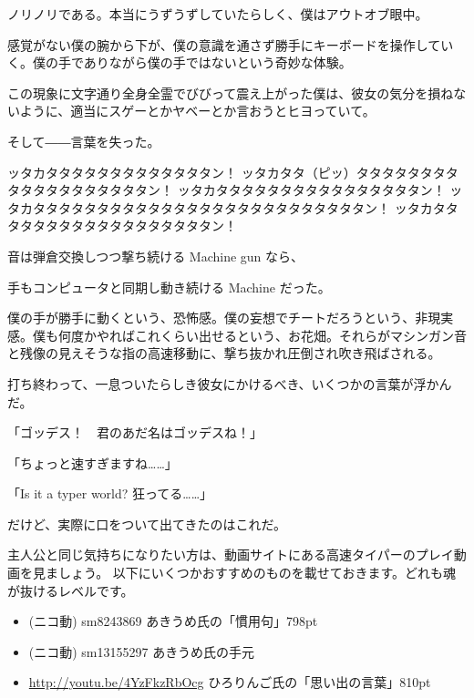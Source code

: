 
ノリノリである。本当にうずうずしていたらしく、僕はアウトオブ眼中。


感覚がない僕の腕から下が、僕の意識を通さず勝手にキーボードを操作していく。僕の手でありながら僕の手ではないという奇妙な体験。

この現象に文字通り全身全霊でびびって震え上がった僕は、彼女の気分を損ねないように、適当にスゲーとかヤベーとか言おうとヒヨっていて。

そして――言葉を失った。

ッタカタタタタタタタタタタタタタン！
ッタカタタ（ピッ）タタタタタタタタタタタタタタタタタタタン！
ッタカタタタタタタタタタタタタタタタタン！
ッタカタタタタタタタタタタタタタタタタタタタタタタタタタタン！
ッタカタタタタタタタタタタタタタタタタタタン！

音は弾倉交換しつつ撃ち続ける Machine gun なら、

手もコンピュータと同期し動き続ける Machine だった。

僕の手が勝手に動くという、恐怖感。僕の妄想でチートだろうという、非現実感。僕も何度かやればこれくらい出せるという、お花畑。それらがマシンガン音と残像の見えそうな指の高速移動に、撃ち抜かれ圧倒され吹き飛ばされる。

打ち終わって、一息ついたらしき彼女にかけるべき、いくつかの言葉が浮かんだ。

「ゴッデス！　君のあだ名はゴッデスね！」

「ちょっと速すぎますね……」

「Is it a typer world? 狂ってる……」

だけど、実際に口をついて出てきたのはこれだ。


\begin{screen}
主人公と同じ気持ちになりたい方は、動画サイトにある高速タイパーのプレイ動画を見ましょう。
以下にいくつかおすすめのものを載せておきます。どれも魂が抜けるレベルです。

\begin{itemize}
 \item (ニコ動) sm8243869 あきうめ氏の「慣用句」798pt
 \item (ニコ動) sm13155297 あきうめ氏の手元
 \item \url{http://youtu.be/4YzFkzRbOcg} ひろりんご氏の「思い出の言葉」810pt
\end{itemize}
\end{screen}

